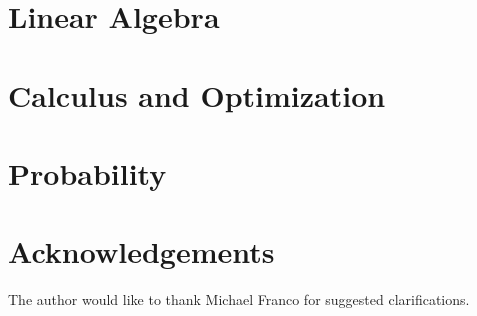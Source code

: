 \documentclass{article}
\begin{document}
\newpage
\section{Linear Algebra}


\newpage
\section{Calculus and Optimization}


\newpage
\section{Probability}


\newpage
\section*{Acknowledgements}
The author would like to thank Michael Franco for suggested clarifications.



\nocite{*}
\end{document}
